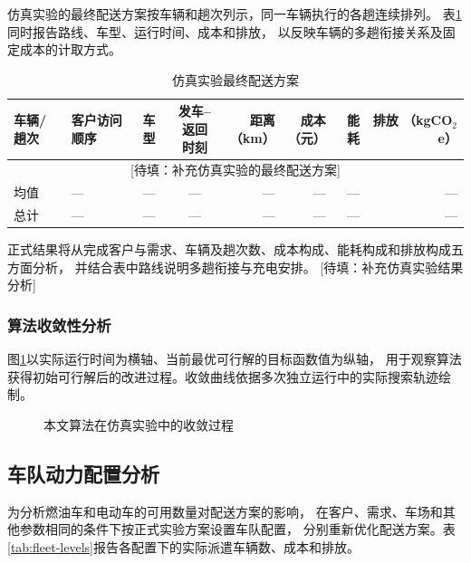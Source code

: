 \documentclass{setp-new}
\DeclareRobustCommand{\TBD}[1]{%
  \textcolor{black!65}{[待填：#1]}}
\begin{document}
仿真实验的最终配送方案按车辆和趟次列示，同一车辆执行的各趟连续排列。
表\ref{tab:final-solution}同时报告路线、车型、运行时间、成本和排放，
以反映车辆的多趟衔接关系及固定成本的计取方式。

\begin{table}[htbp]
  \centering
  \caption{仿真实验最终配送方案}
  \label{tab:final-solution}
  \small
  \setlength{\tabcolsep}{2.2pt}
  \begin{tabularx}{\textwidth}{@{}l>{\RaggedRight\arraybackslash}Xccrrrr@{}}
    \toprule
    车辆/趟次 & 客户访问顺序 & 车型 & \makecell{发车--返回\\时刻} & \makecell{距离\\（km）} & \makecell{成本\\（元）} & 能耗 & \makecell{排放\\（kgCO$_2$e）}\\
    \midrule
    \multicolumn{8}{c}{\TBD{补充仿真实验的最终配送方案}}\\
    \midrule
    均值 & --- & --- & --- & --- & --- & --- & ---\\
    总计 & --- & --- & --- & --- & --- & --- & ---\\
    \bottomrule
  \end{tabularx}
\end{table}

正式结果将从完成客户与需求、车辆及趟次数、成本构成、能耗构成和排放构成五方面分析，
并结合表中路线说明多趟衔接与充电安排。\TBD{补充仿真实验结果分析}

\subsubsection{算法收敛性分析}

图\ref{fig:convergence}以实际运行时间为横轴、当前最优可行解的目标函数值为纵轴，
用于观察算法获得初始可行解后的改进过程。收敛曲线依据多次独立运行中的实际搜索轨迹绘制。

\begin{figure}[H]
  \centering
  \fbox{\parbox[c][3.8cm][c]{0.86\textwidth}{\centering
  \fontsize{8pt}{9.6pt}\selectfont\TBD{依据实际搜索轨迹绘制算法收敛曲线}}}
  \caption{本文算法在仿真实验中的收敛过程}
  \label{fig:convergence}
\end{figure}

\subsection{车队动力配置分析}

为分析燃油车和电动车的可用数量对配送方案的影响，
在客户、需求、车场和其他参数相同的条件下按正式实验方案设置车队配置，
分别重新优化配送方案。表\ref{tab:fleet-levels}报告各配置下的实际派遣车辆数、成本和排放。
\end{document}
